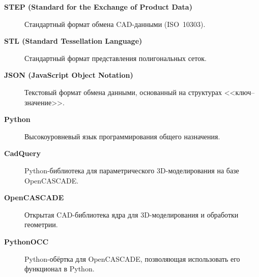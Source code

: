 \begin{description}
	\item[\textbf{STEP (Standard for the Exchange of Product Data)}] %
	      Стандартный формат обмена CAD-данными (ISO~10303).
	\item[\textbf{STL (Standard Tessellation Language)}] %
	      Стандартный формат представления полигональных сеток.
	\item[\textbf{JSON (JavaScript Object Notation)}] %
	      Текстовый формат обмена данными, основанный на структурах <<ключ--значение>>.
	\item[\textbf{Python}] %
	      Высокоуровневый язык программирования общего назначения.
	\item[\textbf{CadQuery}] %
	      Python-библиотека для параметрического 3D-моделирования на базе OpenCASCADE.
	\item[\textbf{OpenCASCADE}] %
	      Открытая CAD-библиотека ядра для 3D-моделирования и обработки геометрии.
	\item[\textbf{PythonOCC}] %
	      Python-обёртка для OpenCASCADE, позволяющая использовать его функционал в Python.
\end{description}

\newpage
